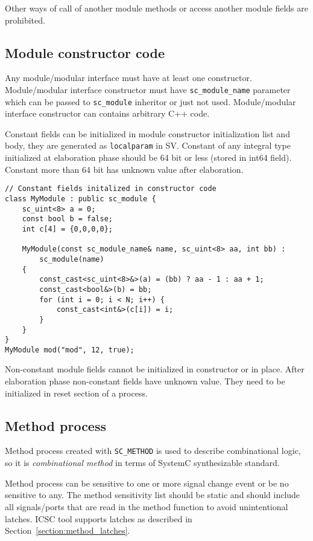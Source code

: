 Other ways of call of another module methods or access another module fields are prohibited. 


\subsection{Module constructor code}

Any module/modular interface must have at least one constructor. Module/modular interface constructor must have {\tt sc\_module\_name} parameter which can be passed to {\tt sc\_module} inheritor or just not used. Module/modular interface constructor can contains arbitrary C++ code. 

Constant fields can be initialized in module constructor initialization list and body, they are generated as {\tt localparam} in SV. Constant of any integral type initialized at elaboration phase should be 64 bit or less (stored in int64 field). Constant more than 64 bit has unknown value after elaboration.

\begin{lstlisting}[style=mycpp]
// Constant fields initalized in constructor code
class MyModule : public sc_module {
    sc_uint<8> a = 0; 
    const bool b = false;
    int c[4] = {0,0,0,0};
    
    MyModule(const sc_module_name& name, sc_uint<8> aa, int bb) :
        sc_module(name)
    {
        const_cast<sc_uint<8>&>(a) = (bb) ? aa - 1 : aa + 1;
        const_cast<bool&>(b) = bb;
        for (int i = 0; i < N; i++) {
            const_cast<int&>(c[i]) = i;
        } 
    }
}
MyModule mod("mod", 12, true);
\end{lstlisting}

Non-constant module fields cannot be initialized in constructor or in place. After elaboration phase non-constant fields have unknown value. They need to be initialized in reset section of a process. 

\subsection{Method process}

Method process created with {\tt SC\_METHOD} is used to describe combinational logic, so it is \emph{combinational method} in terms of SystemC synthesizable standard. 

Method process can be sensitive to one or more signal change event or be no sensitive to any. The method sensitivity list should be static and should include all signals/ports that are read in the method function to avoid unintentional latches. ICSC tool supports latches as described in Section~\ref{section:method_latches}. 


